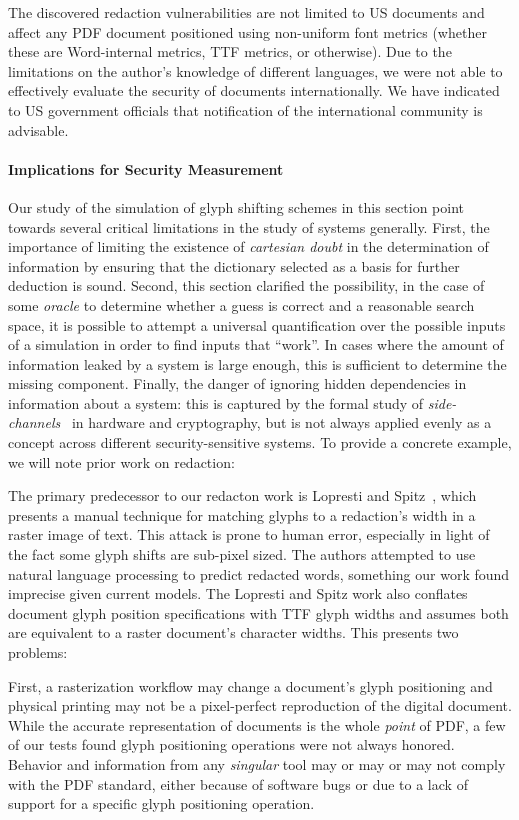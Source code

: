 The discovered redaction vulnerabilities are not limited to US documents and affect any PDF document positioned using non-uniform font metrics (whether these are Word-internal metrics, TTF metrics, or otherwise).
Due to the limitations on the author's knowledge of different languages, we were not able to effectively evaluate the security of documents internationally.
We have indicated to US government officials that notification of the international community is advisable.

\paragraph{Implications for Security Measurement}
Our study of the simulation of glyph shifting schemes in this section point towards several critical limitations in the study of systems generally.
First, the importance of limiting the existence of \emph{cartesian doubt} in the determination of information by ensuring that the dictionary selected as a basis for further deduction is sound.
Second, this section clarified the possibility, in the case of some \emph{oracle} to determine whether a guess is correct and a reasonable search space, it is possible to attempt a universal quantification over the possible inputs of a simulation in order to find inputs that ``work''.
In cases where the amount of information leaked by a system is large enough, this is sufficient to determine the missing component.
Finally, the danger of ignoring hidden dependencies in information about a system: this is captured by the formal study of \emph{side-channels}~\cite{zhou2005side} in hardware and cryptography, but is not always applied evenly as a concept across different security-sensitive systems.
To provide a concrete example, we will note prior work on redaction:

The primary predecessor to our redacton work is Lopresti and Spitz~\cite{lopresti2004quantifying}, which presents a manual technique for matching glyphs to a redaction's width in a raster image of text.
This attack is prone to human error, especially in light of the fact some glyph shifts are sub-pixel sized.
The authors attempted to use natural language processing to predict redacted words, something our work found imprecise given current models.
The Lopresti and Spitz work also conflates document glyph position specifications with TTF glyph widths and assumes both are equivalent to a raster document's character widths.
This presents two problems:

First, a rasterization workflow may change a document's glyph positioning and physical printing may not be a pixel-perfect reproduction of the digital document.
While the accurate representation of documents is the whole \emph{point} of PDF, a few of our tests found glyph positioning operations were not always honored.
Behavior and information from any \emph{singular} tool may or may or may not comply with the PDF standard, either because of software bugs or due to a lack of support for a specific glyph positioning operation.

